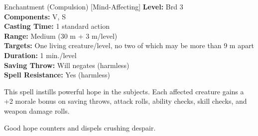 {Enchantment (Compulsion) [Mind-Affecting]}
{
	\textbf{Level:}
	Brd 3\\
	\textbf{Components:}
	V, S\\
	\textbf{Casting Time:}
	1 standard action\\
	\textbf{Range:}
	Medium (30 m + 3 m/level)\\
	\textbf{Targets:}
	One living creature/level, no two of which may be more than 9 m apart\\
	\textbf{Duration:}
	1 min./level\\
	\textbf{Saving Throw:}
	Will negates (harmless)\\
	\textbf{Spell Resistance:}
	Yes (harmless)\\
}
{
	This spell instills powerful hope in the subjects. Each affected creature gains a +2 morale bonus on saving throws, attack rolls, ability checks, skill checks, and weapon damage rolls.

	Good hope counters and dispels crushing despair.

}
